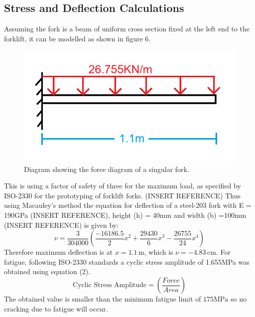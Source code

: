 \documentclass[12pt]{article}
\begin{document}
\subsection {Stress and Deflection Calculations}
Assuming the fork is a beam of uniform cross section fixed at the left end to the forklift, it can be modelled as shown in {figure 6}.
\begin{figure} [H]
    \centering
    \includegraphics[width=0.5\linewidth]{fork as a beam diagram.png}
    \caption{Diagram showing the force diagram of a singular fork.}
    \label{fig:x}
\end{figure}
This is using a factor of safety of three for the maximum load, as specified by ISO-2330 for the prototyping of forklift forks. (INSERT REFERENCE)
Thus using Macauley's method the equation for deflection of a steel-203 fork with E = 190GPa (INSERT REFERENCE), height (h) = 40mm and width (b) =100mm (INSERT REFERENCE) is given by:
\begin{equation}
   \nu = \frac{3}{304000} \left( \frac{-16186.5}{2}x^2 + \frac{29430}{6}x^3 - \frac{26755}{24}x^4 \right)
\end{equation}
Therefore maximum deflection is at \(x = 1.1 \, \text{m}\), which is \(\nu = -4.83 \, \text{cm}\).
For fatigue, following ISO-2330 standards a cyclic stress amplitude of 1.655MPa was obtained using equation (2).
\begin{equation}
   \text{Cyclic Stress Amplitude} = \left (\frac{Force}{Area} \right)
\end{equation}
The obtained value is smaller than the minimum fatigue limit of \(175 \text{MPa}\) so no cracking due to fatigue will occur.
\end{document}
